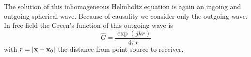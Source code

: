 The solution of this inhomogeneous Helmholtz equation is again an
ingoing and outgoing spherical wave. Because of causality we consider only the
outgoing wave. In free field the Green's function of this outgoing wave is
\begin{equation}\label{eq:theory:sound:green-free-field}
  \hat{G} = \frac{\exp{\left(jkr\right)}}{4 \pi r}
\end{equation}
with $r = \left| \mathbf{x} - \mathbf{x}_0 \right|$ the distance from point source to receiver.



